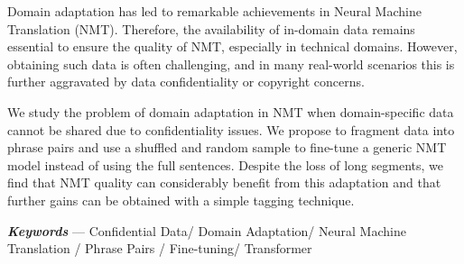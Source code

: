 Domain adaptation has led to remarkable achievements in Neural Machine Translation (NMT). Therefore, the availability of in-domain data remains essential to ensure the quality of NMT, especially in technical domains. However, obtaining such data is often challenging, and in many real-world scenarios this is further aggravated by data confidentiality or copyright concerns. 

We study the problem of domain adaptation in NMT when domain-specific data cannot be shared due to confidentiality issues. We propose to fragment data into phrase pairs and use a shuffled and random sample to fine-tune a generic NMT model instead of using the full sentences. Despite the loss of long segments, we find that NMT quality can considerably benefit from this adaptation and that further gains can be obtained with a simple tagging technique.

\medskip


\textbf{\emph{Keywords}} --- Confidential Data/ Domain Adaptation/ Neural Machine Translation / Phrase Pairs / Fine-tuning/ Transformer